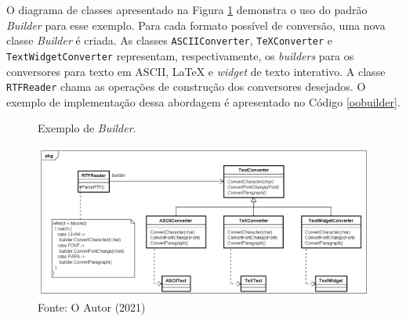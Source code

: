 O diagrama de classes apresentado na Figura 
\ref{builder_exemplo} demonstra o uso do padrão 
\textit{Builder} para esse exemplo. Para cada formato possível 
de conversão, uma nova classe \textit{Builder} é criada. 
As classes \texttt{ASCIIConverter}, \texttt{TeXConverter} e 
\texttt{TextWidgetConverter} representam, respectivamente, 
os \textit{builders} para os conversores para texto 
em ASCII, LaTeX e \textit{widget} de texto interativo. 
A classe \texttt{RTFReader} chama as operações de construção 
dos conversores desejados. O exemplo de 
implementação dessa abordagem é apresentado no 
Código \ref{oobuilder}.

\begin{figure}[htb]
	\caption{\label{builder_exemplo}Exemplo de \textit{Builder}.}
	\begin{center}
	    \includegraphics[scale=0.5]{5_padroes-contexto-funcional/5.1_criacionais/5.1.3_builder/builder_exemplo.png}
	\end{center}
  \caption*{Fonte: O Autor (2021)}
\end{figure}

